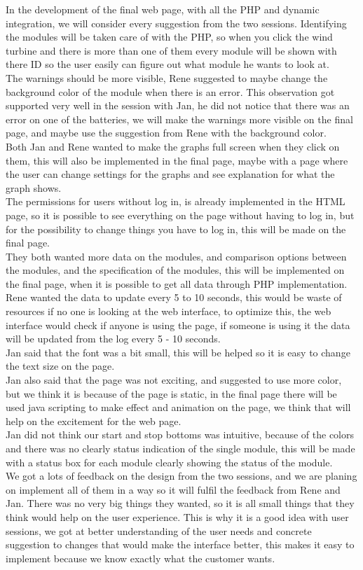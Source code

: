 In the development of the final web page, with all the PHP and dynamic integration, we will consider every suggestion from the two sessions. Identifying the modules will be taken care of with the PHP, so when you click the wind turbine and there is more than one of them every module will be shown with there ID so the user easily can figure out what module he wants to look at.\\
The warnings should be more visible, Rene suggested to maybe change the background color of the module when there is an error. This observation got supported very well in the session with Jan, he did not notice that there was an error on one of the batteries, we will make the warnings more visible on the final page, and maybe use the suggestion from Rene with the background color.\\
Both Jan and Rene wanted to make the graphs full screen when they click on them, this will also be implemented in the final page, maybe with a page where the user can change settings for the graphs and see explanation for what the graph shows.\\
The permissions for users without log in, is already implemented in the HTML page, so it is possible to see everything on the page without having to log in, but for the possibility to change things you have to log in, this will be made on the final page.\\
They both wanted more data on the modules, and comparison options between the modules, and the specification of the modules, this will be implemented on the final page, when it is possible to get all data through PHP implementation.\\
Rene wanted the data to update every 5 to 10 seconds, this would be waste of resources if no one is looking at the web interface, to optimize this, the web interface would check if anyone is using the page, if someone is using it the data will be updated from the log every 5 - 10 seconds.\\
Jan said that the font was a bit small, this will be helped so it is easy to change the text size on the page.\\
Jan also said that the page was not exciting, and suggested to use more color, but we think it is because of the page is static, in the final page there will be used java scripting to make effect and animation on the page, we think that will help on the excitement for the web page.\\
Jan did not think our start and stop bottoms was intuitive, because of the colors and there was no clearly status indication of the single module, this will be made with a status box for each module clearly showing the status of the module.\\
We got a lots of feedback on the design from the two sessions, and we are planing on implement all of them in a way so it will fulfil the feedback from Rene and Jan. There was no very big things they wanted, so it is all small things that they think would help on the user experience. This is why it is a good idea with user sessions, we got at better understanding of the user needs and concrete suggestion to changes that would make the interface better, this makes it easy to implement because we know exactly what the customer wants.


